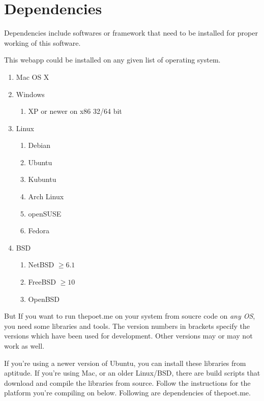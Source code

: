 \section{Dependencies}
Dependencies include softwares or framework that need to be installed for proper working of this software.

This webapp could be installed on any given list of operating system.

\begin{enumerate}
	\item Mac OS X
	\item Windows
	 \begin{enumerate} 
	 	\item XP or newer on x86 32/64 bit
	 \end{enumerate}
	\item Linux
	\begin{enumerate} 
		\item Debian 
		\item Ubuntu 
		\item Kubuntu
		\item Arch Linux
		\item openSUSE
		\item Fedora
	 \end{enumerate}
	\item BSD
	\begin{enumerate}
		\item NetBSD  $\geq 6.1$
		\item FreeBSD $\geq 10 $
		\item OpenBSD
	\end{enumerate}
\end{enumerate}	 
 

But If you want to run thepoet.me on your system from soucre code on \emph{any OS}, you need some libraries and tools. The version
numbers in brackets specify the versions which have been used for
development. Other versions may or may not work as well.

If you're using a newer version of Ubuntu, you can install these 
libraries from aptitude. If you're using Mac, or an older Linux/BSD, there 
are build scripts that download and compile the libraries from source. 
Follow the instructions for the platform you're compiling on below. Following are
dependencies of thepoet.me.

